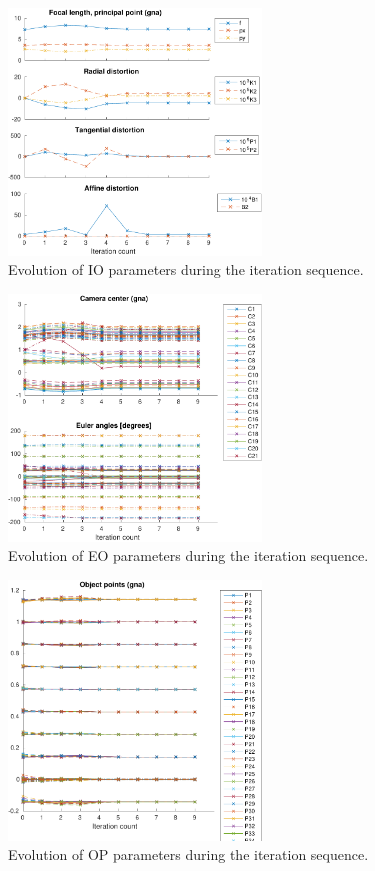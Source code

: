 \documentclass{article}
\begin{document}
\begin{figure}[tbp]
\centering
\includegraphics[width=0.6\textwidth]{./ill/ccamiotrace.pdf}
\caption{\label{fig:IOtrace}
Evolution of IO parameters during the iteration sequence.}
\end{figure}

\begin{figure}[tbp]
\centering
\includegraphics[width=0.6\textwidth]{./ill/ccameotrace.pdf}
\caption{\label{fig:EOtrace}
Evolution of EO parameters during the iteration sequence.}
\end{figure}

\begin{figure}[tbp]
\centering
\includegraphics[width=0.6\textwidth]{./ill/ccamoptrace.pdf}
\caption{\label{fig:OPtrace}
Evolution of OP parameters during the iteration sequence.}
\end{figure}
\end{document}
